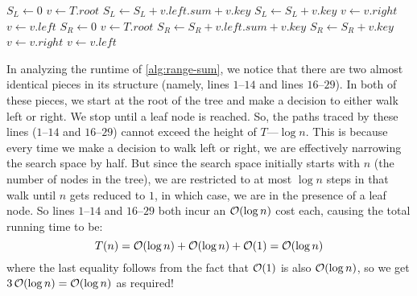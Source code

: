\documentclass{article}
\begin{document}
\begin{enumerate}[leftmargin={*}, font={\bf}, label={\arabic*.}, ref={\arabic*}]
\begin{enumerate}[ref={(\alph*)}]
        \begin{minipage}{\linewidth}
          \begin{algorithm}[H]
            \caption{$\textsc{Range-Sum}(T,x_l,x_r)$}\label{alg:range-sum}
            \begin{algorithmic}[1]
              \State $S_L \gets 0$ 
              \State $v \gets T.root$
                    \State $S_L \gets S_L + v.left.sum + v.key$
                  \Else
                    \State $S_L \gets S_L + v.key$
                  \EndIf
                  \State $v \gets v.right$
                \Else
                  \State $v \gets v.left$
                \EndIf
              \EndWhile
              \State
              \State $S_R \gets 0$ 
              \State $v \gets T.root$
                    \State $S_R \gets S_R + v.left.sum + v.key$
                  \Else
                    \State $S_R \gets S_R + v.key$
                  \EndIf
                  \State $v \gets v.right$
                \Else
                  \State $v \gets v.left$
                \EndIf
              \EndWhile
              \State
              \State {} 
            \end{algorithmic}
          \end{algorithm}
        \end{minipage}

        In analyzing the runtime of \autoref{alg:range-sum}, we notice that there are two almost
        identical pieces in its structure (namely, lines $1$--$14$ and lines $16$--$29$). In both
        of these pieces, we start at the root of the tree and make a decision to either walk left
        or right. We stop until a leaf node is reached. So, the paths traced by these lines
        ($1$--$14$ and $16$--$29$) cannot exceed the height of $T$---$\log n$. This is because every
        time we make a decision to walk left or right, we are effectively narrowing the search space
        by half. But since the search space initially starts with $n$ (the number of nodes in the
        tree), we are restricted to at most $\log n$ steps in that walk until $n$ gets reduced to
        $1$, in which case, we are in the presence of a leaf node. So lines $1$--$14$ and $16$--$29$
        both incur an $\operatorname*{\mathcal{O}}(\log n)$ cost each, causing the total running time to be:
        \[
          T(n) = \operatorname*{\mathcal{O}}(\log n) + \operatorname*{\mathcal{O}}(\log n) + \operatorname*{\mathcal{O}}(1) = \operatorname*{\mathcal{O}}(\log n)
        \]
        where the last equality follows from the fact that $\operatorname*{\mathcal{O}}(1)$ is also $\operatorname*{\mathcal{O}}(\log n)$, so we get
        $3\operatorname*{\mathcal{O}}(\log n) = \operatorname*{\mathcal{O}}(\log n)$ as required!


\end{enumerate}
\end{enumerate}
\end{document}

